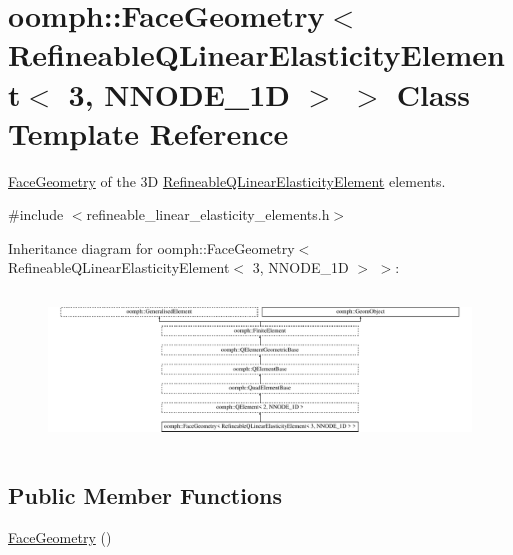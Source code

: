 \hypertarget{classoomph_1_1FaceGeometry_3_01RefineableQLinearElasticityElement_3_013_00_01NNODE__1D_01_4_01_4}{}\section{oomph\+:\+:Face\+Geometry$<$ Refineable\+Q\+Linear\+Elasticity\+Element$<$ 3, N\+N\+O\+D\+E\+\_\+1D $>$ $>$ Class Template Reference}
\label{classoomph_1_1FaceGeometry_3_01RefineableQLinearElasticityElement_3_013_00_01NNODE__1D_01_4_01_4}


\hyperlink{classoomph_1_1FaceGeometry}{Face\+Geometry} of the 3D \hyperlink{classoomph_1_1RefineableQLinearElasticityElement}{Refineable\+Q\+Linear\+Elasticity\+Element} elements.  




{\ttfamily \#include $<$refineable\+\_\+linear\+\_\+elasticity\+\_\+elements.\+h$>$}

Inheritance diagram for oomph\+:\+:Face\+Geometry$<$ Refineable\+Q\+Linear\+Elasticity\+Element$<$ 3, N\+N\+O\+D\+E\+\_\+1D $>$ $>$\+:\begin{figure}[H]
\begin{center}
\leavevmode
\includegraphics[height=4.100419cm]{classoomph_1_1FaceGeometry_3_01RefineableQLinearElasticityElement_3_013_00_01NNODE__1D_01_4_01_4}
\end{center}
\end{figure}
\subsection*{Public Member Functions}
\begin{DoxyCompactItemize}
\item 
\hyperlink{classoomph_1_1FaceGeometry_3_01RefineableQLinearElasticityElement_3_013_00_01NNODE__1D_01_4_01_4_a0538785e2b249c6444a96aa003cd2dc7}{Face\+Geometry} ()
\end{DoxyCompactItemize}
